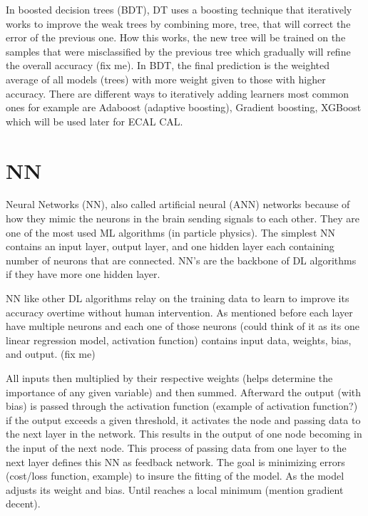 In boosted decision trees (BDT), DT uses a boosting technique that iteratively works to improve the weak trees by combining more, tree, that will correct the error of the previous one. How this works, the new tree will be trained on the samples that were misclassified by the previous tree which gradually will refine the overall accuracy (fix me).  In BDT, the final prediction is the weighted average of all models (trees) with more weight given to those with higher accuracy.  There are different ways to iteratively adding learners %
most common ones for example are Adaboost (adaptive boosting), Gradient boosting, XGBoost which will be used later for ECAL CAL.

\section{NN}
Neural Networks (NN), also called artificial neural (ANN) networks because of how they mimic the neurons in the brain sending signals to each other. 
They are one of the most used ML algorithms (in particle physics). 
The simplest NN contains an input layer, output layer, and one hidden layer each containing number of neurons that are connected. NN’s are the backbone of DL algorithms if they have more one hidden layer. %

NN like other DL algorithms relay on the training data to learn to improve its accuracy overtime without human intervention. As mentioned before each layer have multiple neurons and each one of those neurons (could think of it as its one linear regression model, activation function) contains input data, weights, bias, and output. (fix me)

All inputs then multiplied by their respective weights (helps determine the importance of any given variable) and then summed. Afterward the output (with bias) is passed through the activation function (example of activation function?) if the output exceeds a given threshold, it activates the node and passing data to the next layer in the network. This results in the output of one node becoming in the input of the next node. This process of passing data from one layer to the next layer defines this NN as feedback network. The goal is minimizing errors (cost/loss function, example) to insure the fitting of the model. As the model adjusts its weight and bias. Until reaches a local minimum (mention gradient decent).











